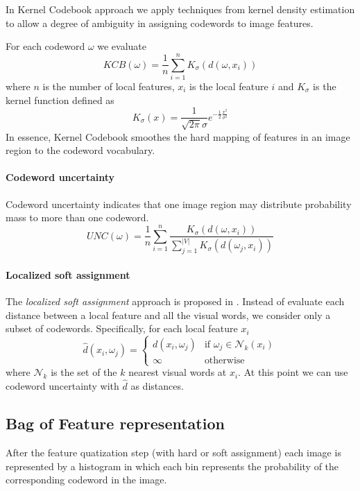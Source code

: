 In Kernel Codebook approach we apply techniques from kernel density estimation to allow a degree of ambiguity in assigning codewords to image features. 

For each codeword $\omega$ we evaluate
\begin{equation}
KCB(\omega) = \frac{1}{n} \sum_{i = 1}^{n} K_{\sigma}(d(\omega, x_i))
\end{equation}
where $n$ is the number of local features, $x_i$ is the local feature $i$ and $K_{\sigma}$ is the kernel function defined as
\begin{equation}
K_{\sigma} (x) = \frac{1}{\sqrt{2\pi} \sigma} e^{- \frac{1}{2} \frac{x^2}{\sigma^2}}
\end{equation}
In essence, Kernel Codebook smoothes the hard mapping of features in an image region to the codeword vocabulary.

\paragraph{Codeword uncertainty}

Codeword uncertainty indicates that one image region may distribute probability mass to more than one codeword.
\begin{equation}
UNC(\omega) = \frac{1}{n} \sum_{i = 1}^{n} \frac{K_{\sigma}(d(\omega, x_i))}{\sum_{j=1}^{|V|} K_{\sigma}(d(\omega_j, x_i))}
\end{equation}

\paragraph{Localized soft assignment}

The \emph{localized soft assignment} approach is proposed in \cite{LingqiaoLiu:2011:DSC:2355573.2356438}. Instead of evaluate each distance between a local feature and all the visual words,  we consider only a subset of codewords. Specifically, for each local feature $x_i$ 
\begin{equation}
\hat{d}(x_i, \omega_j) =
\left\{
\begin{array}{ll}
d(x_i, \omega_j) & \mbox{if } \omega_j \in \mathcal{N}_k(x_i) \\
\infty & \mbox{otherwise}
\end{array}
\right.
\end{equation}
where $\mathcal{N}_k$ is the set of the $k$ nearest visual words at $x_i$. At this point we can use codeword uncertainty with $\hat{d}$ as distances.

\subsection{Bag of Feature representation}

After the feature quatization step (with hard or soft assignment) each image is represented by a histogram in which each bin represents the probability of the corresponding codeword in the image.



